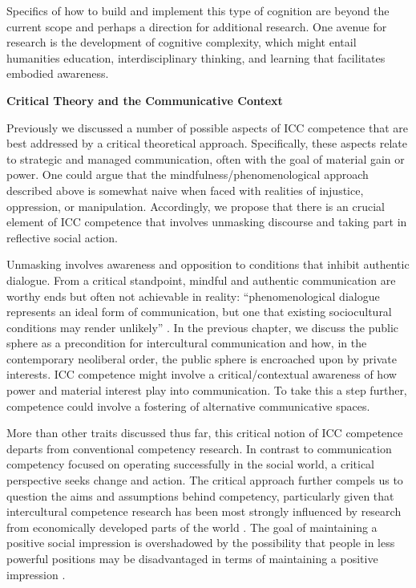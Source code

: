 Specifics of how to build and implement this type of cognition are beyond the current scope and perhaps a direction for additional research. One avenue for research is the development of cognitive complexity, which might entail humanities education, interdisciplinary thinking, and learning that facilitates embodied awareness.         

\textbf{Critical Theory and the Communicative Context}

Previously we discussed a number of possible aspects of ICC competence that are best addressed by a critical theoretical approach. Specifically, these aspects relate to strategic and managed communication, often with the goal of material gain or power. One could argue that the mindfulness/phenomenological approach described above is somewhat naive when faced with realities of injustice, oppression, or manipulation. Accordingly, we propose that there is an crucial element of ICC competence that involves unmasking discourse and taking part in reflective social action.

Unmasking involves awareness and opposition to conditions that inhibit authentic dialogue. From a critical standpoint, mindful and authentic communication are worthy ends but often not achievable in reality: ``phenomenological dialogue represents an ideal form of communication, but one that existing sociocultural conditions may render unlikely'' \cite[148]{Craig1999a}. In the previous chapter, we discuss the public sphere as a precondition for intercultural communication and how, in the contemporary neoliberal order, the public sphere is encroached upon by private interests. ICC competence might involve a critical/contextual awareness of how power and material interest play into communication. To take this a step further, competence could involve a fostering of alternative communicative spaces.      

More than other traits discussed thus far, this critical notion of ICC competence departs from conventional competency research. In contrast to communication competency focused on operating successfully in the social world, a critical perspective seeks change and action. The critical approach further compels us to question the aims and assumptions behind competency, particularly given that intercultural competence research has been most strongly influenced by research from economically developed parts of the world \citep{Arasaratnam}. The goal of maintaining a positive social impression is overshadowed by the possibility that people in less powerful positions may be disadvantaged in terms of maintaining a positive impression \citep{Spencer-Oatey2009}.

